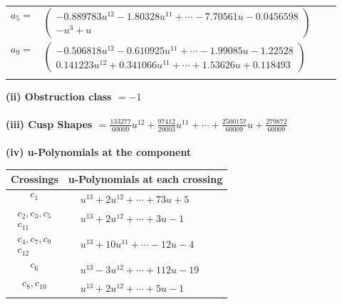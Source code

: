 \documentclass[1p]{elsarticle_modified}
\theoremstyle{definition}
\begin{document}
\begin{tabular}{m{7pt} m{180pt} m{7pt} m{180pt} }
\flushright $a_{5}=$&$\begin{pmatrix}-0.889783 u^{12}-1.80328 u^{11}+\cdots-7.70561 u-0.0456598\\- u^3+u\end{pmatrix}$ \\
\flushright $a_{9}=$&$\begin{pmatrix}-0.506818 u^{12}-0.610925 u^{11}+\cdots-1.99085 u-1.22528\\0.141223 u^{12}+0.341066 u^{11}+\cdots+1.53626 u+0.118493\end{pmatrix}$\\&\end{tabular}
\flushleft \textbf{(ii) Obstruction class $= -1$}\\~\\
\flushleft \textbf{(iii) Cusp Shapes $= \frac{133277}{60009} u^{12}+\frac{97412}{20003} u^{11}+\cdots+\frac{2500157}{60009} u+\frac{279872}{60009}$}\\~\\
\newpage\renewcommand{\arraystretch}{1}
\flushleft \textbf{(iv) u-Polynomials at the component}\newline \\
\begin{tabular}{m{50pt}|m{274pt}}
Crossings & \hspace{64pt}u-Polynomials at each crossing \\
\hline $$\begin{aligned}c_{1}\end{aligned}$$&$\begin{aligned}
&u^{13}+2 u^{12}+\cdots+73 u+5
\end{aligned}$\\
\hline $$\begin{aligned}c_{2},c_{3},c_{5}\\c_{11}\end{aligned}$$&$\begin{aligned}
&u^{13}+2 u^{12}+\cdots+3 u-1
\end{aligned}$\\
\hline $$\begin{aligned}c_{4},c_{7},c_{9}\\c_{12}\end{aligned}$$&$\begin{aligned}
&u^{13}+10 u^{11}+\cdots-12 u-4
\end{aligned}$\\
\hline $$\begin{aligned}c_{6}\end{aligned}$$&$\begin{aligned}
&u^{13}-3 u^{12}+\cdots+112 u-19
\end{aligned}$\\
\hline $$\begin{aligned}c_{8},c_{10}\end{aligned}$$&$\begin{aligned}
&u^{13}+2 u^{12}+\cdots+5 u-1
\end{aligned}$\\
\hline
\end{tabular}\\~\\
\end{document}
